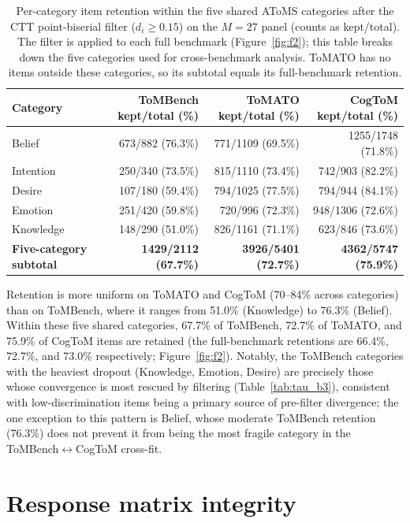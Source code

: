 \documentclass{article} %
\begin{document}
\begin{table}[h]
\centering
\small
\caption{Per-category item retention within the five shared AToMS categories after the CTT point-biserial filter ($d_i \ge 0.15$) on the $M=27$ panel (counts as kept/total). The filter is applied to each full benchmark (Figure~\ref{fig:f2}); this table breaks down the five categories used for cross-benchmark analysis. ToMATO has no items outside these categories, so its subtotal equals its full-benchmark retention.}
\label{tab:retention}
\begin{tabular}{lrrr}
\toprule
Category & ToMBench kept/total (\%) & ToMATO kept/total (\%) & CogToM kept/total (\%) \\
\midrule
Belief & 673/882 (76.3\%) & 771/1109 (69.5\%) & 1255/1748 (71.8\%) \\
Intention & 250/340 (73.5\%) & 815/1110 (73.4\%) & 742/903 (82.2\%) \\
Desire & 107/180 (59.4\%) & 794/1025 (77.5\%) & 794/944 (84.1\%) \\
Emotion & 251/420 (59.8\%) & 720/996 (72.3\%) & 948/1306 (72.6\%) \\
Knowledge & 148/290 (51.0\%) & 826/1161 (71.1\%) & 623/846 (73.6\%) \\
\midrule
\textbf{Five-category subtotal} & \textbf{1429/2112 (67.7\%)} & \textbf{3926/5401 (72.7\%)} & \textbf{4362/5747 (75.9\%)} \\
\bottomrule
\end{tabular}
\end{table}
 
Retention is more uniform on ToMATO and CogToM (70--84\% across categories) than on ToMBench, where it ranges from 51.0\% (Knowledge) to 76.3\% (Belief). Within these five shared categories, 67.7\% of ToMBench, 72.7\% of ToMATO, and 75.9\% of CogToM items are retained (the full-benchmark retentions are 66.4\%, 72.7\%, and 73.0\% respectively; Figure~\ref{fig:f2}). Notably, the ToMBench categories with the heaviest dropout (Knowledge, Emotion, Desire) are precisely those whose convergence is most rescued by filtering (Table~\ref{tab:tau_b3}), consistent with low-discrimination items being a primary source of pre-filter divergence; the one exception to this pattern is Belief, whose moderate ToMBench retention (76.3\%) does not prevent it from being the most fragile category in the ToMBench$\leftrightarrow$CogToM cross-fit.
 
\section{Response matrix integrity}
\label{app:integrity}
 
\end{document}
